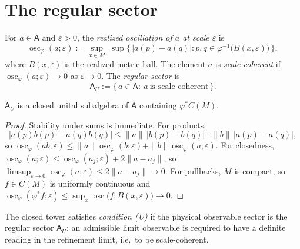 \section{The regular sector}
\label{sec:dyn-coherence}
\begin{definition}
	\label{def:dyn-oscillation}
	For \(a\in\mathsf A\) and \(\varepsilon>0\), the \emph{realized
		oscillation of \(a\) at scale \(\varepsilon\)} is
	\[
		\operatorname{osc}_\varphi(a;\varepsilon)
		:=
		\sup_{x\in M}\;
		\sup\bigl\{\,
		|a(p)-a(q)|
		:
		p,q\in\varphi^{-1}\bigl(B(x,\varepsilon)\bigr)
		\,\bigr\},
	\]
	where \(B(x,\varepsilon)\) is the realized metric ball. The element
	\(a\) is \emph{scale-coherent} if
	\(\operatorname{osc}_\varphi(a;\varepsilon)\to0\) as
	\(\varepsilon\to0\). The \emph{regular sector} is
	\[
		\mathsf A_U
		:=
		\{\,a\in\mathsf A:\ a\ \text{is scale-coherent}\,\}.
	\]
\end{definition}

\begin{lemma}
	\label{lem:dyn-regular-structure}
	\(\mathsf A_U\) is a closed unital subalgebra of \(\mathsf A\)
	containing \(\varphi^*C(M)\).
\end{lemma}
\begin{proof}
	Stability under sums is immediate. For products,
	\[
		|a(p)b(p)-a(q)b(q)|
		\le
		\|a\|\,|b(p)-b(q)|+\|b\|\,|a(p)-a(q)|,
	\]
	so
	\(\operatorname{osc}_\varphi(ab;\varepsilon)\le
	\|a\|\operatorname{osc}_\varphi(b;\varepsilon)
	+\|b\|\operatorname{osc}_\varphi(a;\varepsilon)\).
	For closedness,
	\(\operatorname{osc}_\varphi(a;\varepsilon)
	\le\operatorname{osc}_\varphi(a_j;\varepsilon)+2\|a-a_j\|\),
	so
	\(\limsup_{\varepsilon\to0}\operatorname{osc}_\varphi(a;\varepsilon)
	\le2\|a-a_j\|\to0\). For pullbacks, \(M\) is compact, so
	\(f\in C(M)\) is uniformly continuous and
	\(\operatorname{osc}_\varphi(\varphi^*f;\varepsilon)
	\le\sup_x\operatorname{osc}\bigl(f;B(x,\varepsilon)\bigr)\to0\).
\end{proof}

\begin{definition}
	\label{def:dyn-scale-coherence}
	The closed tower satisfies \emph{condition \textup{(U)}} if the
	physical observable sector is the regular sector \(\mathsf A_U\):
	an admissible limit observable is required to have a definite
	reading in the refinement limit, i.e.\ to be scale-coherent.
\end{definition}

